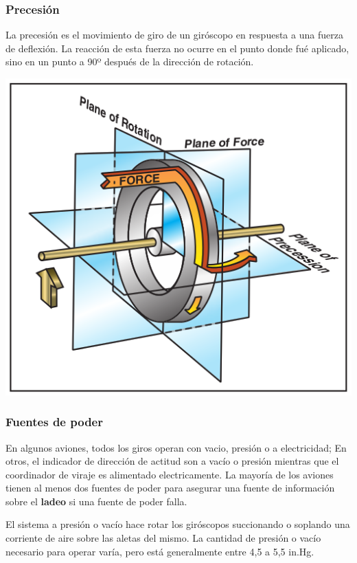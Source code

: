 \documentclass{article}
\begin{document}
\subsubsection*{Precesión}
La precesión es el movimiento de giro de un giróscopo en respuesta a una fuerza de deflexión. La reacción de esta fuerza no ocurre en el punto donde fué aplicado, sino en un punto a 90º después de la dirección de rotación.

\begin{center}
\includegraphics[scale=0.5]{figuras/giroscopo-precesion.png}
\label{fig:presecion}
\end{center}

\subsubsection*{Fuentes de poder}
En algunos aviones, todos los giros operan con vacio, presión o a electricidad; En otros, el indicador de dirección de actitud son a vacío o presión mientras que el coordinador de viraje es  alimentado electricamente. La mayoría de los aviones tienen al menos dos fuentes de poder para asegurar una fuente de información sobre el \textbf{ladeo} si una fuente de poder falla.

El sistema a presión o vacío hace rotar los giróscopos succionando o soplando una corriente de aire sobre las aletas del mismo. La cantidad de presión o vacío necesario para operar varía, pero está generalmente entre 4,5 a 5,5 in.Hg.
\end{document}
